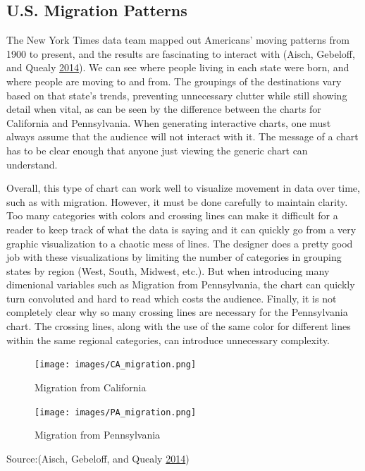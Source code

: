 \documentclass[]{book}
\begin{document}
\hypertarget{u.s.-migration-patterns}{%
\subsection{U.S. Migration Patterns}\label{u.s.-migration-patterns}}

The New York Times data team mapped out Americans' moving patterns from 1900 to present, and the results are fascinating to interact with (Aisch, Gebeloff, and Quealy \protect\hyperlink{ref-migration}{2014}). We can see where people living in each state were born, and where people are moving to and from. The groupings of the destinations vary based on that state's trends, preventing unnecessary clutter while still showing detail when vital, as can be seen by the difference between the charts for California and Pennsylvania. When generating interactive charts, one must always assume that the audience will not interact with it. The message of a chart has to be clear enough that anyone just viewing the generic chart can understand.

Overall, this type of chart can work well to visualize movement in data over time, such as with migration. However, it must be done carefully to maintain clarity. Too many categories with colors and crossing lines can make it difficult for a reader to keep track of what the data is saying and it can quickly go from a very graphic visualization to a chaotic mess of lines. The designer does a pretty good job with these visualizations by limiting the number of categories in grouping states by region (West, South, Midwest, etc.). But when introducing many dimenional variables such as Migration from Pennsylvania, the chart can quickly turn convoluted and hard to read which costs the audience. Finally, it is not completely clear why so many crossing lines are necessary for the Pennsylvania chart. The crossing lines, along with the use of the same color for different lines within the same regional categories, can introduce unnecessary complexity.

\begin{figure}
\centering
\texttt{[image: images/CA\_migration.png]}
\caption{Migration from California}
\end{figure}

\begin{figure}
\centering
\texttt{[image: images/PA\_migration.png]}
\caption{Migration from Pennsylvania}
\end{figure}

Source:(Aisch, Gebeloff, and Quealy \protect\hyperlink{ref-migration}{2014})
\end{document}
